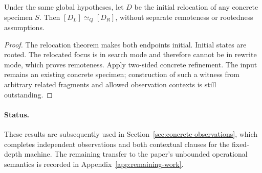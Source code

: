 \begin{corollary}
Under the same global hypotheses, let $D$ be the initial relocation of any concrete specimen $S$. Then $[D_L]\simeq_Q[D_R]$, without separate remoteness or rootedness assumptions.
\end{corollary}
\begin{proof}
The relocation theorem makes both endpoints initial. Initial states are rooted. The relocated focus is in search mode and therefore cannot be in rewrite mode, which proves remoteness. Apply two-sided concrete refinement. The input remains an existing concrete specimen; construction of such a witness from arbitrary related fragments and allowed observation contexts is still outstanding.
\end{proof}

\paragraph{Status.}
These results are subsequently used in Section~\ref{sec:concrete-observations},
which completes independent observations and both contextual clauses for
the fixed-depth machine. The remaining transfer to the paper's unbounded
operational semantics is recorded in Appendix~\ref{app:remaining-work}.
